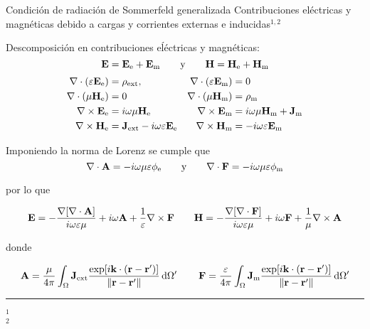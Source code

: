 \begin{frame}{Condición de radiación de Sommerfeld generalizada}
{Contribuciones eléctricas y magnéticas debido a cargas y corrientes externas e inducidas$^{1,2}$}\small

Descomposición en contribuciones eĺéctricas y magnéticas:
$$
\vb{E} =  \vb{E}_\text{e} +  \vb{E}_\text{m}\qquad \text{y} \qquad \vb{H} =  \vb{H}_\text{e} +  \vb{H}_\text{m}
$$
\begin{align*}
    \nabla \cdot \qty(\varepsilon \vb{E}_\text{e})  &= \rho_\text{ext},
                    &\nabla \cdot \qty(\varepsilon \vb{E}_\text{m})  &= 0\\
    \nabla \cdot  (\mu\vb{H}_\text{e})  &= 0
                    & \nabla \cdot  (\mu\vb{H}_\text{m})  &= \rho_\text{m}\\
    \nabla \times \vb{E}_\text{e}  &= i\omega \mu \vb{H}_\text{e}
                    & \nabla \times \vb{E}_\text{m}  &= i\omega \mu \vb{H}_\text{m} + \vb{J}_\text{m}\\
    \nabla \times \vb{H}_\text{e}  &= \vb{J}_\text{ext} - i\omega \varepsilon \vb{E}_\text{e}
                & \nabla \times \vb{H}_\text{m}  &=- i\omega \varepsilon \vb{E}_\text{m}
\end{align*}

Imponiendo la norma de Lorenz se cumple que
$$\nabla\cdot\vb{A} = -i\omega\mu\varepsilon \phi_\text{e}\qquad \text{y} \qquad \nabla\cdot\vb{F} = -i\omega\mu\varepsilon \phi_\text{m}$$

por lo que

\begin{align*}
    \vb{E} = - \dfrac{\nabla[\nabla\cdot\vb{A}]}{i\omega\varepsilon\mu} + i \omega\vb{A} + \dfrac{1}{\varepsilon}\nabla\times\vb{F}
    \qquad
    \vb{H} =- \dfrac{\nabla[\nabla\cdot\vb{F}]}{i\omega\varepsilon\mu} + i \omega\vb{F} + \dfrac{1}{\mu}\nabla\times\vb{A}
\end{align*}

donde

\begin{align*}
    \vb{A} = \dfrac{\mu}{4\pi} \int_\Omega \vb{J}_\text{ext}  \dfrac{\exp[i\vb{k}\cdot(\vb{r}-\vb{r}')]}{\norm{\vb{r}-\vb{r}'}}\dd{\Omega'}
    \qquad
    \vb{F} = \dfrac{\varepsilon}{4\pi} \int_\Omega \vb{J}_\text{m}  \dfrac{\exp[i\vb{k}\cdot(\vb{r}-\vb{r}')]}{\norm{\vb{r}-\vb{r}'}}\dd{\Omega'}
\end{align*}

%
	\noindent\rule{.25\textwidth}{0.4pt}
 \begin{spacing}{0}\fontsize{4}{12} \selectfont
	$^1$ \\
	$^2$ 
	\end{spacing}
\end{frame}



